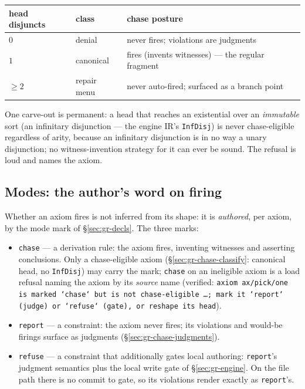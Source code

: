 \begin{center}
\begin{tabular}{lll}
\toprule
head disjuncts & class & chase posture \\
\midrule
$0$ & denial & never fires; violations are judgments \\
$1$ & canonical & fires (invents witnesses) — the regular fragment \\
$\geq 2$ & repair menu & never auto-fired; surfaced as a branch point \\
\bottomrule
\end{tabular}
\end{center}

\noindent One carve-out is permanent: a head that reaches an
existential over an \emph{immutable} sort (an infinitary disjunction
— the engine IR's \texttt{InfDisj}) is never chase-eligible
regardless of arity, because an infinitary disjunction is in no way a
unary disjunction; no witness-invention strategy for it can ever be
sound. The refusal is loud and names the axiom.

\subsection{Modes: the author's word on firing}
\label{sec:gr-chase-modes}

Whether an axiom fires is not inferred from its shape: it is
\emph{authored}, per axiom, by the mode mark of
\S\ref{sec:gr-decls}. The three marks:

\begin{itemize}
\item \texttt{chase} — a derivation rule: the axiom fires, inventing
witnesses and asserting conclusions. Only a chase-eligible axiom
(\S\ref{sec:gr-chase-classify}: canonical head, no \texttt{InfDisj})
may carry the mark; \texttt{chase} on an ineligible axiom is a load
refusal naming the axiom by its \emph{source} name (verified:
\texttt{axiom ax/pick/one is marked `chase` but is not chase-eligible
…; mark it `report` (judge) or `refuse` (gate), or reshape its
head}).
\item \texttt{report} — a constraint: the axiom never fires; its
violations and would-be firings surface as judgments
(\S\ref{sec:gr-chase-judgments}).
\item \texttt{refuse} — a constraint that additionally gates local
authoring: \texttt{report}'s judgment semantics plus the local write
gate of \S\ref{sec:gr-engine}. On the file path there is no commit to
gate, so its violations render exactly as \texttt{report}'s.
\end{itemize}

